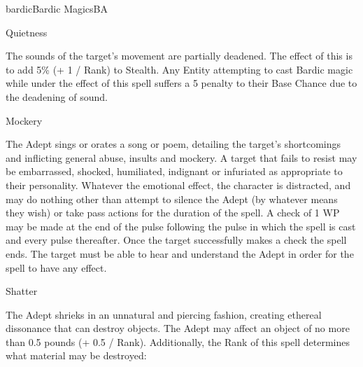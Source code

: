 \begin{college}[2.1]{bardic}{Bardic Magics}{BA}
\begin{spell}[G-5]{Quietness}

\begin{effects}
The sounds of the target's movement are partially deadened.  The
effect of this is to add 5\% (+ 1 / Rank) to Stealth.  Any Entity
attempting to cast Bardic magic while under the effect of this spell
suffers a 5 penalty to their Base Chance due to the deadening of
sound.
\end{effects}
\end{spell}

\begin{spell}[G-6]{Mockery}

\begin{effects}
The Adept sings or orates a song or poem, detailing the target's
shortcomings and inflicting general abuse, insults and mockery. A
target that fails to resist may be embarrassed, shocked, humiliated,
indignant or infuriated as appropriate to their personality.  Whatever
the emotional effect, the character is distracted, and may do nothing
other than attempt to silence the Adept (by whatever means they wish)
or take pass actions for the duration of the spell.  A check of 1 \x
WP may be made at the end of the pulse following the pulse in which
the spell is cast and every pulse thereafter. Once the target
successfully makes a check the spell ends. The target must be able to
hear and understand the Adept in order for the spell to have any
effect.
\end{effects}
\end{spell}

\begin{spell}[G-7]{Shatter}

\begin{effects}
The Adept shrieks in an unnatural and piercing fashion, creating
ethereal dissonance that can destroy objects. The Adept may affect an
object of no more than 0.5 pounds (+ 0.5 / Rank).  Additionally, the
Rank of this spell determines what material may be destroyed:


\end{effects}
\end{spell}
\end{college}
